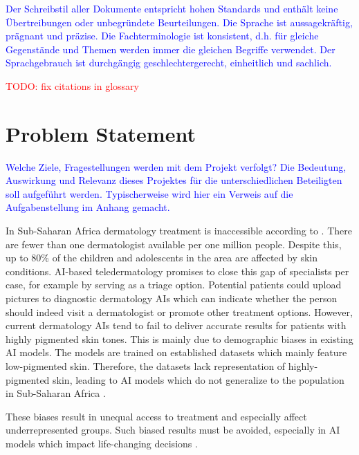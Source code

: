 \documentclass[12pt, a4paper, oneside]{book}   	%
\renewcommand{\todo}[1]{\textcolor{red}{TODO: #1}}
\newcommand{\baaCriteria}[1]{\textcolor{blue}{#1}}
\begin{document}
	
	\baaCriteria{Der Schreibstil aller Dokumente entspricht hohen Standards und enthält keine Übertreibungen oder unbegründete Beurteilungen. Die Sprache ist aussagekräftig, prägnant und präzise. Die Fachterminologie ist konsistent, d.h. für gleiche Gegenstände und Themen werden immer die gleichen Begriffe verwendet. Der Sprachgebrauch ist durchgängig geschlechtergerecht, einheitlich und sachlich.}
	
	\listoffigures
	\listoftables
	\printnoidxglossaries
	
	\todo{fix citations in glossary}
	
	\mainmatter
	
	
	\chapter{Problem Statement}
		\baaCriteria{Welche Ziele, Fragestellungen werden mit dem Projekt verfolgt? Die Bedeutung, Auswirkung und Relevanz dieses Projektes für die unterschiedlichen Beteiligten soll aufgeführt werden. Typischerweise wird hier ein Verweis auf die Aufgabenstellung im Anhang gemacht.}
		
		In Sub-Saharan Africa dermatology treatment is inaccessible according to \textcite{Gottfrois2024}. There are fewer than one dermatologist available per one million people. Despite this, up to 80\% of the children and adolescents in the area are affected by skin conditions. AI-based \gls{teledermatology} promises to close this gap of specialists per case, for example by serving as a triage option. Potential patients could upload pictures to diagnostic dermatology AIs which can indicate whether the person should indeed visit a dermatologist or promote other treatment options. However, current dermatology AIs tend to fail to deliver accurate results for patients with highly pigmented skin tones. This is mainly due to demographic biases in existing AI models. The models are trained on established datasets which mainly feature low-pigmented skin. Therefore, the datasets lack representation of highly-pigmented skin, leading to AI models which do not generalize to the population in Sub-Saharan Africa \autocite{Gottfrois2024}.
		
		These biases result in unequal access to treatment and especially affect underrepresented groups. Such biased results must be avoided, especially in AI models which impact life-changing decisions \autocite{Mehrabi_2021}.
		
\end{document}
